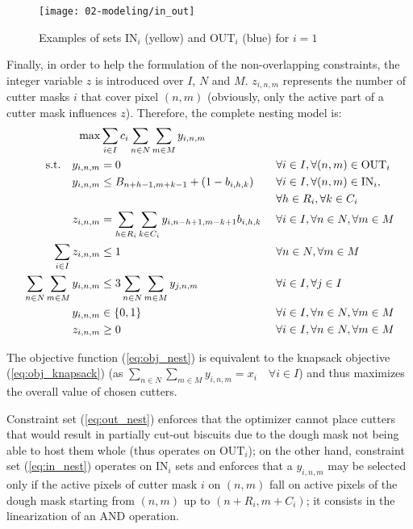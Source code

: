 \begin{figure}[H]
	\centering	
	\texttt{[image: 02-modeling/in\_out]}
	\caption{Examples of sets $\textrm{IN}_i$ (yellow) and $\textrm{OUT}_i$ (blue) for $i=1$}
	\label{fig:in_out}
\end{figure}

Finally, in order to help the formulation of the non-overlapping constraints, the integer variable $z$ is introduced over $I$, $N$ and $M$. $z_{i, n, m}$ represents the number of cutter masks $i$ that cover pixel $(n, m)$ (obviously, only the active part of a cutter mask influences $z$). Therefore, the complete nesting model is:
\begin{alignat}{3}
	\textrm{max}	& \sum_{i \in I}{c_i \sum_{n \in N}{\sum_{m \in M}{y_{i,n,m}}}} && \label{eq:obj_nest} \\
	\textrm{s.t.} \quad y_{i, n, m} & = 0 && \forall i \in I, \forall (n, m) \in \textrm{OUT}_i \label{eq:out_nest} \\
	y_{i, n, m} & \leq B_{n+h-1, m+k-1} + (1 - b_{i, h, k}) && \forall i \in I, \forall (n, m) \in \textrm{IN}_i, \notag \\
	& & & \forall h \in R_i, \forall k \in C_i \label{eq:in_nest} \\
	z_{i, n, m} & = \sum_{h \in R_i}{\sum_{k \in C_i}{y_{i,n-h+1, m-k+1}  b_{i, h, k}}} &\ & \forall i \in I, \forall n \in N, \forall m \in M \label{eq:link_nest} \\
	\sum_{i \in I}{z_{i, n, m}} & \leq 1 && \forall n \in N, \forall m \in M \label{eq:overlap_nest} \\
	\sum_{n \in N}{\sum_{m \in M}{y_{i,n,m}}} & \leq 3 \sum_{n \in N}{\sum_{m \in M}{y_{j,n,m}}} && \forall i \in I, \forall j \in I \label{eq:freq_nest} \\					
y_{i, n, m} & \in \{0, 1\} && \forall i \in I, \forall n \in N, \forall m \in M \label{eq:def_y} \\
z_{i, n, m} & \geq 0 && \forall i \in I, \forall n \in N, \forall m \in M \label{eq:def_z}
\end{alignat}

The objective function (\ref{eq:obj_nest}) is equivalent to the knapsack objective (\ref{eq:obj_knapsack}) (as $\sum_{n \in N}{\sum_{m \in M}{y_{i,n,m}}} = x_i \quad \forall i \in I$) and thus maximizes the overall value of chosen cutters. 

Constraint set (\ref{eq:out_nest}) enforces that the optimizer cannot place cutters that would result in partially cut-out biscuits due to the dough mask not being able to host them whole (thus operates on $\textrm{OUT}_i$); on the other hand, constraint set (\ref{eq:in_nest}) operates on $\textrm{IN}_i$ sets and enforces that a $y_{i, n, m}$ may be selected only if the active pixels of cutter mask $i$ on $(n, m)$ fall on active pixels of the dough mask starting from $(n, m)$ up to $(n+R_i, m+C_i)$; it consists in the linearization of an AND operation. 

